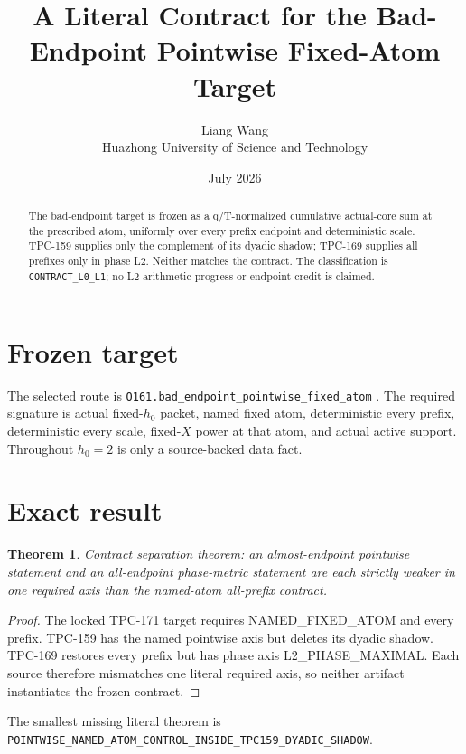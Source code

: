 \documentclass[11pt]{article}
\title{\textbf{A Literal Contract for the Bad-Endpoint Pointwise Fixed-Atom Target}}
\author{Liang Wang\\Huazhong University of Science and Technology}
\date{July 2026}
\newtheorem{theorem}{Theorem}
\begin{document}
\maketitle
\begin{abstract}
The bad-endpoint target is frozen as a q/T-normalized cumulative actual-core sum at the prescribed atom, uniformly over every prefix endpoint and deterministic scale.  TPC-159 supplies only the complement of its dyadic shadow; TPC-169 supplies all prefixes only in phase L2.  Neither matches the contract.
The classification is \texttt{CONTRACT\_\allowbreak{}L0\_\allowbreak{}L1}; no L2 arithmetic
progress or endpoint credit is claimed.
\end{abstract}

\section{Frozen target}
The selected route is \texttt{O161.bad\_\allowbreak{}endpoint\_\allowbreak{}pointwise\_\allowbreak{}fixed\_\allowbreak{}atom} \citep{TPC182}.  The required
signature is actual fixed-$h_0$ packet, named fixed atom, deterministic every
prefix, deterministic every scale, fixed-$X$ power at that atom, and actual
active support.  Throughout $h_0=2$ is only a source-backed data fact.

\section{Exact result}
\begin{theorem}
Contract separation theorem: an almost-endpoint pointwise statement and an all-endpoint phase-metric statement are each strictly weaker in one required axis than the named-atom all-prefix contract.
\end{theorem}
\begin{proof}
The locked TPC-171 target requires NAMED\_\allowbreak{}FIXED\_\allowbreak{}ATOM and every prefix. TPC-159 has the named pointwise axis but deletes its dyadic shadow. TPC-169 restores every prefix but has phase axis L2\_\allowbreak{}PHASE\_\allowbreak{}MAXIMAL. Each source therefore mismatches one literal required axis, so neither artifact instantiates the frozen contract.
\end{proof}

The smallest missing literal theorem is
\texttt{POINTWISE\_\allowbreak{}NAMED\_\allowbreak{}ATOM\_\allowbreak{}CONTROL\_\allowbreak{}INSIDE\_\allowbreak{}TPC159\_\allowbreak{}DYADIC\_\allowbreak{}SHADOW}.
\end{document}
